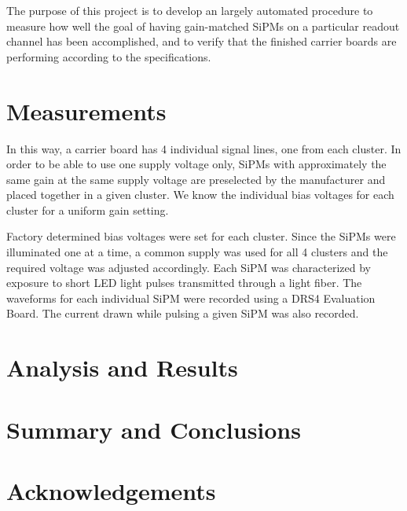 \documentclass{article}
\begin{document}
The purpose of this project is to develop an largely automated procedure to measure how well the goal of having gain-matched SiPMs on a particular readout channel has been accomplished, and to verify that the finished carrier boards are performing according to the specifications. 

\section{Measurements}

 In this way, a carrier board has 4 individual signal lines, one from each cluster. In order to be able to use one supply voltage only, SiPMs with approximately the same gain at the same supply voltage are preselected by the manufacturer and placed together in a given cluster. We know the individual bias voltages for each cluster for a uniform gain setting.

Factory determined bias voltages were set for each cluster. Since the SiPMs were illuminated one at a time, a common supply was used for all 4 clusters and the required voltage was adjusted accordingly. Each SiPM was characterized by exposure to short LED light pulses transmitted through a light fiber. The waveforms for each individual SiPM were recorded using a DRS4 Evaluation Board. The current drawn while pulsing a given SiPM was also recorded. %


\section{Analysis and Results}



\section{Summary and Conclusions}



\section{Acknowledgements}





\end{document}
